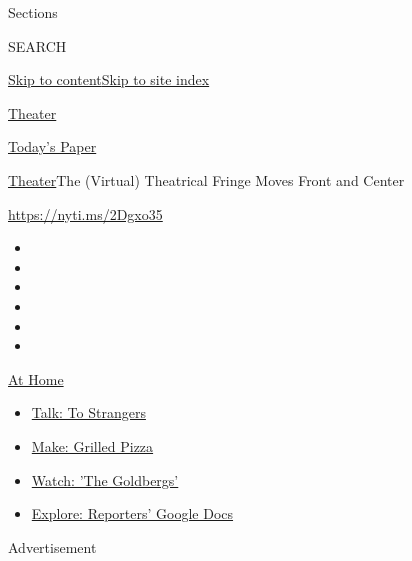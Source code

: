 Sections

SEARCH

\protect\hyperlink{site-content}{Skip to
content}\protect\hyperlink{site-index}{Skip to site index}

\href{https://www.nytimes.com/section/theater}{Theater}

\href{https://myaccount.nytimes.com/auth/login?response_type=cookie\&client_id=vi}{}

\href{https://www.nytimes.com/section/todayspaper}{Today's Paper}

\href{/section/theater}{Theater}\textbar{}The (Virtual) Theatrical
Fringe Moves Front and Center

\url{https://nyti.ms/2Dgxo35}

\begin{itemize}
\item
\item
\item
\item
\item
\item
\end{itemize}

\href{https://www.nytimes.com/spotlight/at-home?action=click\&pgtype=Article\&state=default\&region=TOP_BANNER\&context=at_home_menu}{At
Home}

\begin{itemize}
\tightlist
\item
  \href{https://www.nytimes.com/2020/08/03/well/family/the-benefits-of-talking-to-strangers.html?action=click\&pgtype=Article\&state=default\&region=TOP_BANNER\&context=at_home_menu}{Talk:
  To Strangers}
\item
  \href{https://www.nytimes.com/2020/08/01/at-home/coronavirus-make-pizza-on-a-grill.html?action=click\&pgtype=Article\&state=default\&region=TOP_BANNER\&context=at_home_menu}{Make:
  Grilled Pizza}
\item
  \href{https://www.nytimes.com/2020/07/31/arts/television/goldbergs-abc-stream.html?action=click\&pgtype=Article\&state=default\&region=TOP_BANNER\&context=at_home_menu}{Watch:
  'The Goldbergs'}
\item
  \href{https://www.nytimes.com/interactive/2020/at-home/even-more-reporters-editors-diaries-lists-recommendations.html?action=click\&pgtype=Article\&state=default\&region=TOP_BANNER\&context=at_home_menu}{Explore:
  Reporters' Google Docs}
\end{itemize}

Advertisement

